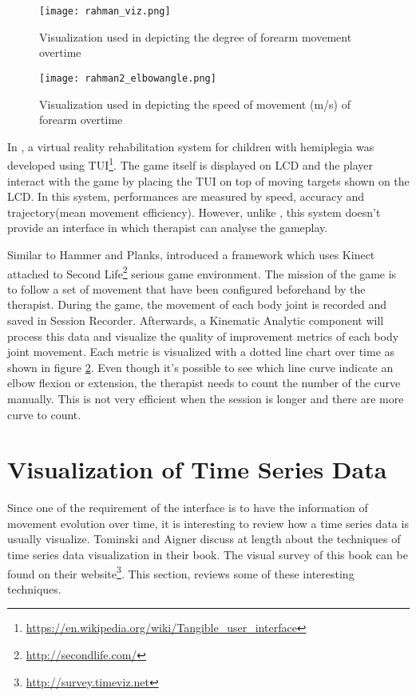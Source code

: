 \begin{figure}
\centering
\texttt{[image: rahman\_viz.png]}
\caption{Visualization used in \cite{rahman} depicting the degree of forearm movement overtime}
\label{rahman_viz}
\end{figure}

\begin{figure}
\centering
\texttt{[image: rahman2\_elbowangle.png]}
\caption{Visualization used in \cite{rahman2} depicting the speed of movement (m/s) of forearm overtime}
\label{rahman2}
\end{figure}

In \cite{green}, a virtual reality rehabilitation system for children with hemiplegia was developed using TUI\footnote{\url{https://en.wikipedia.org/wiki/Tangible_user_interface}}. The game itself is displayed on LCD and the player interact with the game by placing the TUI on top of moving targets shown on the LCD. In this system, performances are measured by speed, accuracy and trajectory(mean movement efficiency). However, unlike \cite{rahman}, this system doesn't provide an interface in which therapist can analyse the gameplay.

Similar to Hammer and Planks, \cite{rahman2} introduced a framework which uses Kinect attached to Second Life\footnote{\url{http://secondlife.com/}} serious game environment. The mission of the game is to follow a set of movement that have been configured beforehand by the therapist. During the game, the movement of each body joint  is recorded and saved in Session Recorder. Afterwards, a Kinematic Analytic component will process this data and visualize the quality of improvement metrics of each body joint movement. Each metric is visualized with a dotted line chart over time as shown in figure \ref{rahman2}. Even though it's possible to  see which line curve indicate an elbow flexion or extension, the therapist needs to count the number of the curve manually. This is not very efficient when the session is longer and there are more curve to count.

\section{Visualization of Time Series Data}

Since one of the requirement of the interface is to have the information of movement evolution over time, it is interesting to review how a time series data is usually visualize. Tominski and Aigner discuss at length about the techniques of time series data visualization in their book\cite{aigner}. The visual survey of this book can be found on their website\footnote{\url{http://survey.timeviz.net}}. This section, reviews some of these interesting techniques.

